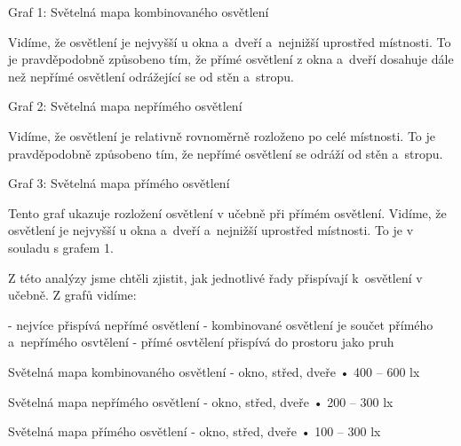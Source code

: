 Graf 1: Světelná mapa kombinovaného osvětlení

Vidíme, že osvětlení je nejvyšší u okna a~dveří a~nejnižší uprostřed místnosti.
To je pravděpodobně způsobeno tím, že přímé osvětlení z okna a~dveří dosahuje dále než nepřímé osvětlení
odrážející se od stěn a~stropu.

Graf 2: Světelná mapa nepřímého osvětlení

Vidíme, že osvětlení je relativně rovnoměrně rozloženo po celé místnosti. To je pravděpodobně způsobeno tím,
že nepřímé osvětlení se odráží od stěn a~stropu.

Graf 3: Světelná mapa přímého osvětlení

Tento graf ukazuje rozložení osvětlení v učebně při přímém osvětlení. Vidíme, že osvětlení je nejvyšší
u okna a~dveří a~nejnižší uprostřed místnosti. To je v souladu s grafem 1.

Z této analýzy jsme chtěli zjistit, jak jednotlivé řady přispívají k~osvětlení v učebně. Z grafů vidíme:

- nejvíce přispívá nepřímé osvětlení
- kombinované osvětlení je součet přímého a~nepřímého osvtělení
- přímé osvtělení přispívá do prostoru jako pruh

Světelná mapa kombinovaného osvětlení - okno, střed, dveře
    • 400 – 600 lx

Světelná mapa nepřímého osvětlení - okno, střed, dveře
    • 200 – 300 lx

Světelná mapa přímého osvětlení - okno, střed, dveře
    • 100 – 300 lx